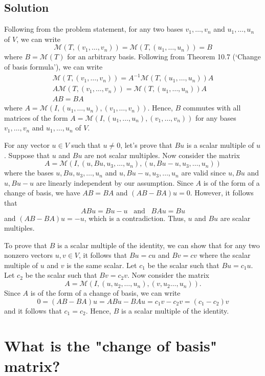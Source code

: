\documentclass{article}
\begin{document}
\subsection*{Solution}
Following from the problem statement, for any two bases $v_1,\ldots,v_n$ and $u_1,\ldots,u_n$ of $V$, we can write 
\[\mathcal{M}(T,(v_1,\ldots,v_n))=\mathcal{M}(T,(u_1,\ldots,u_n))=B\]
where $B=\mathcal{M}(T)$ for an arbitrary basis. 
Following from Theorem 10.7 (`Change of basis formula'), we can write
\begin{gather*}
    \mathcal{M}(T,(v_1,\ldots,v_n))=A^{-1}\mathcal{M}(T,(u_1,\ldots,u_n))A\\
    A\mathcal{M}(T,(v_1,\ldots,v_n))=\mathcal{M}(T,(u_1,\ldots,u_n))A\\
    AB=BA
\end{gather*}
where $A=\mathcal{M}(I,(u_1,\ldots,u_n),(v_1,\ldots,v_n))$. 
Hence, $B$ commutes with all matrices of the form $A=\mathcal{M}(I,(u_1,\ldots,u_n),(v_1,\ldots,v_n))$ for any bases $v_1,\ldots,v_n$ and $u_1,\ldots,u_n$ of $V$. 

For any vector $u\in V$ such that $u\neq 0$, let's prove that $Bu$ is a scalar multiple of $u$. Suppose that $u$ and $Bu$ are not scalar multiples. 
Now consider the matrix
\[A=\mathcal{M}(I,(u,Bu,u_3,\ldots,u_n),(u,Bu-u,u_3,\dots,u_n))\]
where the bases $u,Bu,u_3,\ldots,u_n$ and $u,Bu-u,u_3,\dots,u_n$ are valid since $u,Bu$ and $u,Bu-u$ are linearly independent by our assumption. 
Since $A$ is of the form of a change of basis, we have $AB=BA$ and $(AB-BA)u=0$. However, it follows that
\[ABu=Bu-u\;\;\;\text{and}\;\;\; BAu=Bu\]
and $(AB-BA)u=-u$, which is a contradiction. 
Thus, $u$ and $Bu$ are scalar multiples.

To prove that $B$ is a scalar multiple of the identity, we can show that for any two nonzero vectors $u,v\in V$, it follows that $Bu=cu$ and $Bv=cv$ where the scalar multiple of $u$ and $v$ is the same scalar. 
Let $c_1$ be the scalar such that $Bu=c_1u$. Let $c_2$ be the scalar such that $Bv=c_2v$. 
Now consider the matrix
\[A=\mathcal{M}(I,(u,u_2,\ldots,u_n),(v,u_2\dots,u_n)).\]
Since $A$ is of the form of a change of basis, we can write
\[0=(AB-BA)u=ABu-BAu=c_1v-c_2v=(c_1-c_2)v\]
and it follows that $c_1=c_2$. 
Hence, $B$ is a scalar multiple of the identity.

\clearpage

\section{What is the "change of basis" matrix?}
\end{document}
